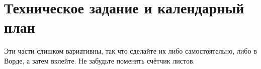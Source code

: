 \section{Техническое задание и календарный план}

Эти части слишком вариативны, так что сделайте их либо самостоятельно, либо в Ворде, а затем вклейте. Не забудьте поменять счётчик листов.